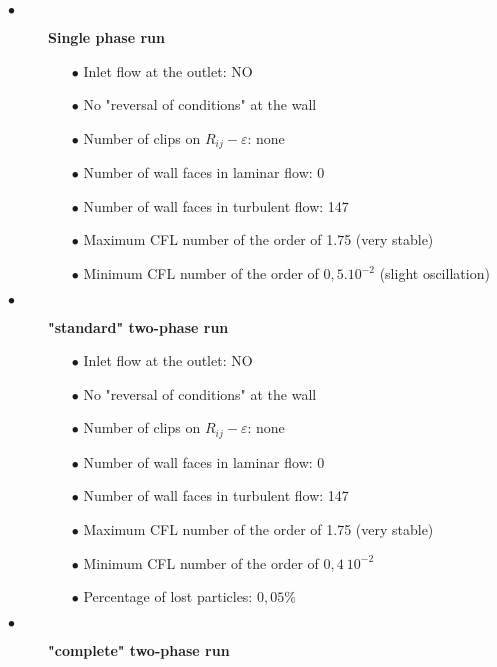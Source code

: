 \documentclass[a4paper,twoside,12pt]{article}
\begin{document}
\begin{description}

   \item[$\bullet$]\textbf{Single phase run}

         \begin{itemize}
            \item[$\bullet$] Inlet flow at the outlet: NO
            \item[$\bullet$] No "reversal of conditions" at the wall
            \item[$\bullet$] Number of clips on $R_{ij}-\varepsilon$: none
            \item[$\bullet$] Number of wall faces in laminar flow: 0
            \item[$\bullet$] Number of wall faces in turbulent flow: 147
            \item[$\bullet$] Maximum CFL number of the order of 1.75 (very stable)
            \item[$\bullet$] Minimum CFL number of the order of $0,5.10^{-2}$ (slight oscillation)
         \end{itemize}

   \item[$\bullet$]\textbf{"standard" two-phase run}

         \begin{itemize}
            \item[$\bullet$] Inlet flow at the outlet: NO
            \item[$\bullet$] No "reversal of conditions" at the wall
            \item[$\bullet$] Number of clips on $R_{ij}-\varepsilon$: none
            \item[$\bullet$] Number of wall faces in laminar flow: 0
            \item[$\bullet$] Number of wall faces in turbulent flow: 147
            \item[$\bullet$] Maximum CFL number of the order of 1.75 (very stable)
            \item[$\bullet$] Minimum CFL number of the order of $0,4~10^{-2}$
            \item[$\bullet$] Percentage of lost particles: $0,05$\%
         \end{itemize}

   \item[$\bullet$]\textbf{"complete" two-phase run}


\end{description}
\end{document}
